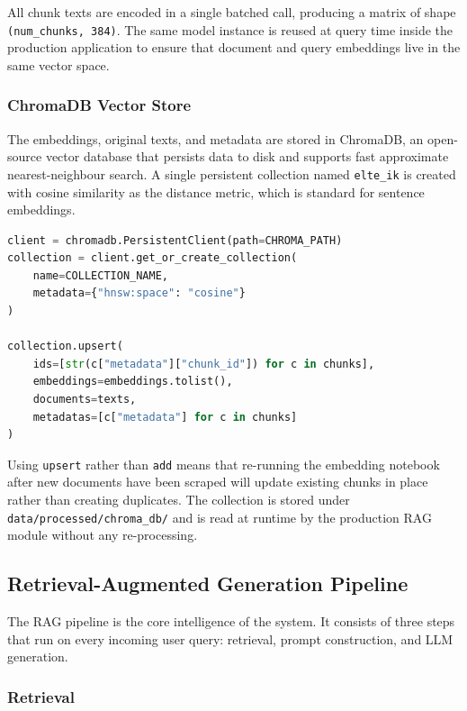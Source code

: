 All chunk texts are encoded in a single batched call, producing a matrix of shape \texttt{(num\_chunks, 384)}. The same model instance is reused at query time inside the production application to ensure that document and query embeddings live in the same vector space.

\subsubsection{ChromaDB Vector Store}

The embeddings, original texts, and metadata are stored in ChromaDB, an open-source vector database that persists data to disk and supports fast approximate nearest-neighbour search. A single persistent collection named \texttt{elte\_ik} is created with cosine similarity as the distance metric, which is standard for sentence embeddings.

\begin{lstlisting}[language=Python]
client = chromadb.PersistentClient(path=CHROMA_PATH)
collection = client.get_or_create_collection(
    name=COLLECTION_NAME,
    metadata={"hnsw:space": "cosine"}
)

collection.upsert(
    ids=[str(c["metadata"]["chunk_id"]) for c in chunks],
    embeddings=embeddings.tolist(),
    documents=texts,
    metadatas=[c["metadata"] for c in chunks]
)
\end{lstlisting}

Using \texttt{upsert} rather than \texttt{add} means that re-running the embedding notebook after new documents have been scraped will update existing chunks in place rather than creating duplicates. The collection is stored under \texttt{data/processed/chroma\_db/} and is read at runtime by the production RAG module without any re-processing.

\subsection{Retrieval-Augmented Generation Pipeline}
\label{sec:impl-rag}

The RAG pipeline is the core intelligence of the system. It consists of three steps that run on every incoming user query: retrieval, prompt construction, and LLM generation.

\subsubsection{Retrieval}


